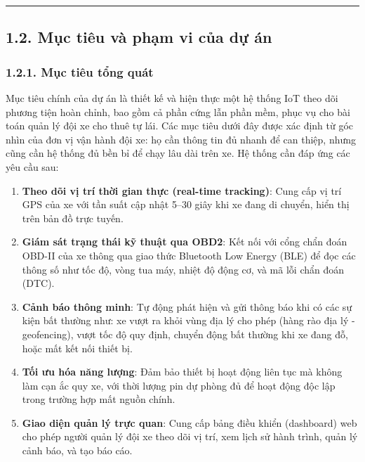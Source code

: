 \documentclass[a4paper]{extarticle}
\providecommand{\tightlist}{%
  \setlength{\itemsep}{0pt}\setlength{\parskip}{0pt}}
\begin{document}
\begin{center}\rule{0.5\linewidth}{0.5pt}\end{center}

\subsection{1.2. Mục tiêu và phạm vi của dự
án}\label{12-mux1ee5c-tiuxeau-vuxe0-phux1ea1m-vi-cux1ee7a-dux1ef1-uxe1n}

\subsubsection{1.2.1. Mục tiêu tổng
quát}\label{121-mux1ee5c-tiuxeau-tux1ed5ng-quuxe1t}

Mục tiêu chính của dự án là thiết kế và hiện thực một hệ thống IoT theo
dõi phương tiện hoàn chỉnh, bao gồm cả phần cứng lẫn phần mềm, phục vụ
cho bài toán quản lý đội xe cho thuê tự lái. Các mục tiêu dưới đây được
xác định từ góc nhìn của đơn vị vận hành đội xe: họ cần thông tin đủ
nhanh để can thiệp, nhưng cũng cần hệ thống đủ bền bỉ để chạy lâu dài
trên xe. Hệ thống cần đáp ứng các yêu cầu sau:

\begin{enumerate}
\def\labelenumi{\arabic{enumi}.}
\tightlist
\item
  \textbf{Theo dõi vị trí thời gian thực (real-time tracking)}: Cung cấp
  vị trí GPS của xe với tần suất cập nhật 5--30 giây khi xe đang di
  chuyển, hiển thị trên bản đồ trực tuyến.
\item
  \textbf{Giám sát trạng thái kỹ thuật qua OBD2}: Kết nối với cổng chẩn
  đoán OBD-II của xe thông qua giao thức Bluetooth Low Energy (BLE) để
  đọc các thông số như tốc độ, vòng tua máy, nhiệt độ động cơ, và mã lỗi
  chẩn đoán (DTC).
\item
  \textbf{Cảnh báo thông minh}: Tự động phát hiện và gửi thông báo khi
  có các sự kiện bất thường như: xe vượt ra khỏi vùng địa lý cho phép
  (hàng rào địa lý - geofencing), vượt tốc độ quy định, chuyển động bất
  thường khi xe đang đỗ, hoặc mất kết nối thiết bị.
\item
  \textbf{Tối ưu hóa năng lượng}: Đảm bảo thiết bị hoạt động liên tục mà
  không làm cạn ắc quy xe, với thời lượng pin dự phòng đủ để hoạt động
  độc lập trong trường hợp mất nguồn chính.
\item
  \textbf{Giao diện quản lý trực quan}: Cung cấp bảng điều khiển
  (dashboard) web cho phép người quản lý đội xe theo dõi vị trí, xem
  lịch sử hành trình, quản lý cảnh báo, và tạo báo cáo.
\end{enumerate}
\end{document}
